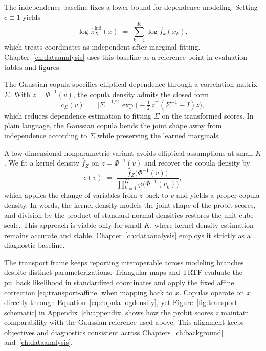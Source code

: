 \documentclass[11pt,a4paper,twoside]{book}\usepackage[]{graphicx}\usepackage[]{xcolor}
\begin{document}
The independence baseline fixes a lower bound for dependence modeling. Setting $c \equiv 1$ yields
\begin{equation}
  \log \widehat \pi_X^{\mathrm{ind}}(x) \;=\; \sum_{k=1}^{K} \log \widehat f_k(x_k),\label{eq:copula-independence}
\end{equation}
which treats coordinates as independent after marginal fitting. Chapter~\ref{ch:dataanalysis} uses this baseline as a reference point in evaluation tables and figures.

The Gaussian copula specifies elliptical dependence through a correlation matrix $\Sigma$. With $z=\Phi^{-1}(v)$, the copula density admits the closed form
\begin{equation}
  c_{\Sigma}(v) \;=\; |\Sigma|^{-1/2}\,\exp\!\Big(-\tfrac{1}{2}\,z^{\top}(\Sigma^{-1} - I)z\Big),\label{eq:copula-gaussian}
\end{equation}
which reduces dependence estimation to fitting $\Sigma$ on the transformed scores. In plain language, the Gaussian copula bends the joint shape away from independence according to $\Sigma$ while preserving the learned marginals.

A low-dimensional nonparametric variant avoids elliptical assumptions at small $K$. We fit a kernel density $\widehat f_Z$ on $z=\Phi^{-1}(v)$ and recover the copula density by
\begin{equation}
  c(v) \;=\; \frac{\widehat f_Z\!\big(\Phi^{-1}(v)\big)}{\prod_{k=1}^{K} \varphi\!\big(\Phi^{-1}(v_k)\big)},\label{eq:copula-kde}
\end{equation}
which applies the change of variables from $z$ back to $v$ and yields a proper copula density. In words, the kernel density models the joint shape of the probit scores, and division by the product of standard normal densities restores the unit-cube scale. This approach is viable only for small $K$, where kernel density estimation remains accurate and stable. Chapter~\ref{ch:dataanalysis} employs it strictly as a diagnostic baseline.

The transport frame keeps reporting interoperable across modeling branches despite distinct parameterizations. Triangular maps and TRTF evaluate the pullback likelihood in standardized coordinates and apply the fixed affine correction \eqref{eq:transport-affine} when mapping back to $x$. Copulas operate on $x$ directly through Equation~\eqref{eq:copula-logdensity}, yet Figure~\ref{fig:transport-schematic} in Appendix~\ref{ch:appendix} shows how the probit scores $z$ maintain comparability with the Gaussian reference used above. This alignment keeps objectives and diagnostics consistent across Chapters~\ref{ch:background} and~\ref{ch:dataanalysis}.
\end{document}
